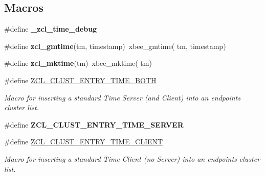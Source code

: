 \subsection*{Macros}
\begin{DoxyCompactItemize}
\item 
\mbox{\label{group__zcl__time_ga5d1d038f66ada681b4430b29f7dc4cda}} 
\#define {\bfseries \+\_\+zcl\+\_\+time\+\_\+debug}
\item 
\mbox{\label{group__zcl__time_ga838affe8c53b76cc63f8113a6f4ca3d4}} 
\#define {\bfseries zcl\+\_\+gmtime}(tm,  timestamp)~xbee\+\_\+gmtime( tm, timestamp)
\item 
\mbox{\label{group__zcl__time_ga55a19a11c22e852cb463f73e28a6e608}} 
\#define {\bfseries zcl\+\_\+mktime}(tm)~xbee\+\_\+mktime( tm)
\item 
\#define \hyperlink{group__zcl__time_gaa45500dbe82c2beea426914014e26fff}{Z\+C\+L\+\_\+\+C\+L\+U\+S\+T\+\_\+\+E\+N\+T\+R\+Y\+\_\+\+T\+I\+M\+E\+\_\+\+B\+O\+TH}
\begin{DoxyCompactList}\small\item\em Macro for inserting a standard Time Server (and Client) into an endpoint\textquotesingle{}s cluster list. \end{DoxyCompactList}\item 
\#define {\bfseries Z\+C\+L\+\_\+\+C\+L\+U\+S\+T\+\_\+\+E\+N\+T\+R\+Y\+\_\+\+T\+I\+M\+E\+\_\+\+S\+E\+R\+V\+ER}
\item 
\#define \hyperlink{group__zcl__time_gac043586e4bfcfa93f631aa144158a17c}{Z\+C\+L\+\_\+\+C\+L\+U\+S\+T\+\_\+\+E\+N\+T\+R\+Y\+\_\+\+T\+I\+M\+E\+\_\+\+C\+L\+I\+E\+NT}
\begin{DoxyCompactList}\small\item\em Macro for inserting a standard Time Client (no Server) into an endpoint\textquotesingle{}s cluster list. \end{DoxyCompactList}\end{DoxyCompactItemize}

